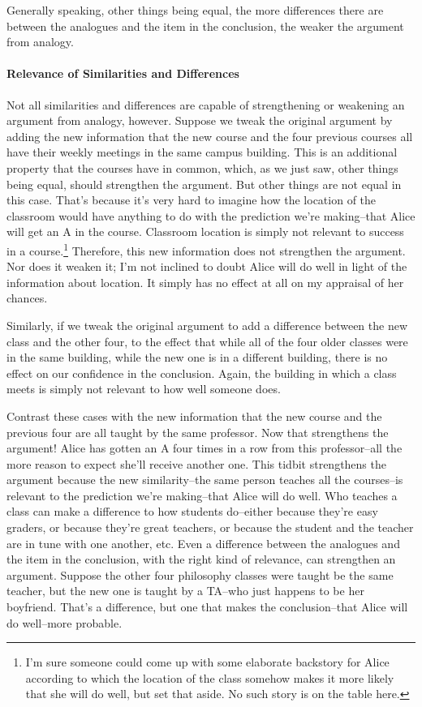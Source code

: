 Generally speaking, other things being equal, the more differences there are between the analogues
and the item in the conclusion, the weaker the argument from analogy.

\paragraph{Relevance of Similarities and Differences}

Not all similarities and differences are capable of strengthening or weakening an argument from
analogy, however. Suppose we tweak the original argument by adding the new information that
the new course and the four previous courses all have their weekly meetings in the same campus
building. This is an additional property that the courses have in common, which, as we just saw,
other things being equal, should strengthen the argument. But other things are not equal in this
case. That's because it's very hard to imagine how the location of the classroom would have
anything to do with the prediction we're making--that Alice will get an A in the course. Classroom
location is simply not relevant to success in a 
course.\footnote{I'm sure someone could come up with some elaborate backstory for Alice according to which the 
location of the
class somehow makes it more likely that she will do well, but set that aside. No such story is on the table here.}
Therefore, this new information does not
strengthen the argument. Nor does it weaken it; I'm not inclined to doubt Alice will do well in
light of the information about location. It simply has no effect at all on my appraisal of her chances.

Similarly, if we tweak the original argument to add a difference between the new class and the
other four, to the effect that while all of the four older classes were in the same building, while the
new one is in a different building, there is no effect on our confidence in the conclusion. Again,
the building in which a class meets is simply not relevant to how well someone does.

Contrast these cases with the new information that the new course and the previous four are all
taught by the same professor. Now that strengthens the argument! Alice has gotten an A four times
in a row from this professor--all the more reason to expect she'll receive another one. This tidbit
strengthens the argument because the new similarity--the same person teaches all the courses--is
relevant to the prediction we're making--that Alice will do well. Who teaches a class can make a
difference to how students do--either because they're easy graders, or because they're great
teachers, or because the student and the teacher are in tune with one another, etc. Even a difference
between the analogues and the item in the conclusion, with the right kind of relevance, can
strengthen an argument. Suppose the other four philosophy classes were taught be the same
teacher, but the new one is taught by a TA--who just happens to be her boyfriend. That's a
difference, but one that makes the conclusion--that Alice will do well--more probable.

